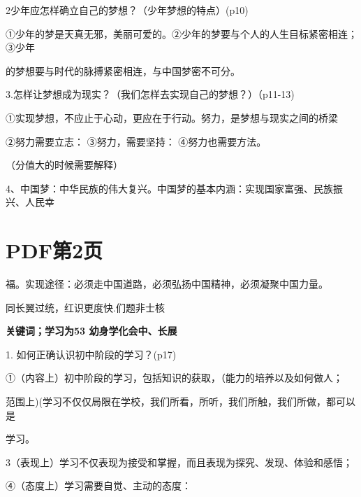 \documentclass[lang=cn,11pt]{elegantbook}
\newcommand{\daofasym}[1]{{\daofasymbolfont #1}}
\newcommand{\daofasym}[1]{#1}
\begin{document}
2少年应怎样确立自己的梦想？（少年梦想的特点）(p10)\par

\daofasym{①}少年的梦是天真无邪，美丽可爱的。\daofasym{②}少年的梦要与个人的人生目标紧密相连；\daofasym{③}少年\par

的梦想要与时代的脉搏紧密相连，与中国梦密不可分。\par

3.怎样让梦想成为现实？（我们怎样去实现自己的梦想？）（p11-13)\par

\daofasym{①}实现梦想，不应止于心动，更应在于行动。努力，是梦想与现实之间的桥梁\par

\daofasym{②}努力需要立志： \daofasym{③}努力，需要坚持： \daofasym{④}努力也需要方法。\par

（分值大的时候需要解释）\par

4、中国梦：中华民族的伟大复兴。中国梦的基本内涵：实现国家富强、民族振兴、人民幸\par


\section*{PDF第2页}

福。实现途径：必须走中国道路，必须弘扬中国精神，必须凝聚中国力量。\par

同长翼过统，红识更度快.们题非士核\par

\textbf{关键词；学习为53 幼身学化会中、长展}\par

1. 如何正确认识初中阶段的学习？(p17)\par

\daofasym{①}（内容上）初中阶段的学习，包括知识的获取，（能力的培养以及如何做人；\par

范围上)(学习不仅仅局限在学校，我们所看，所听，我们所触，我们所做，都可以是\par

学习。\par

3（表现上）学习不仅表现为接受和掌握，而且表现为探究、发现、体验和感悟；\par

\daofasym{④}（态度上）学习需要自觉、主动的态度：\par
\end{document}
